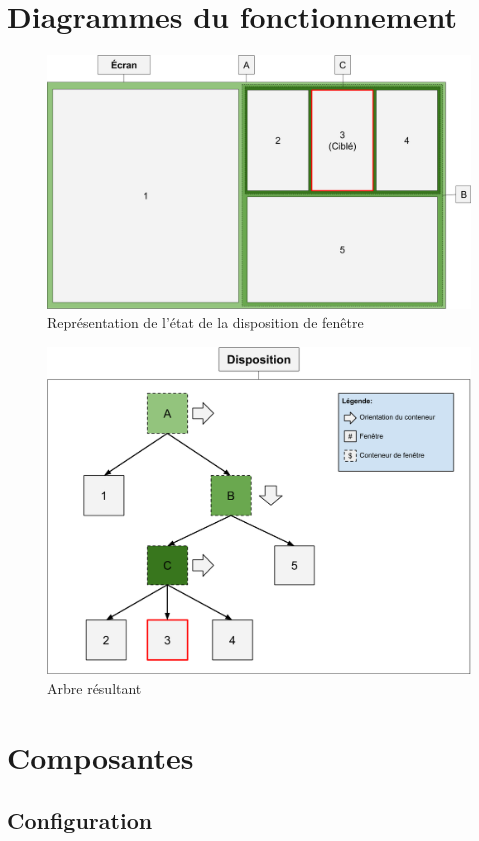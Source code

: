 \documentclass[titlepage]{article}
\begin{document}
\section{Diagrammes du fonctionnement}
\begin{figure}[H]
	\centering
	\includegraphics[width=\textwidth]{diagramme_du_fonctionnement.png}
	\caption{Représentation de l'état de la disposition de fenêtre}
\end{figure}
\begin{figure}[H]
	\centering
	\includegraphics[width=\textwidth]{diagramme_du_fonctionnement_arbre.png}
	\caption{Arbre résultant}
\end{figure}
\section{Composantes}
\subsection{Configuration}
\end{document}
